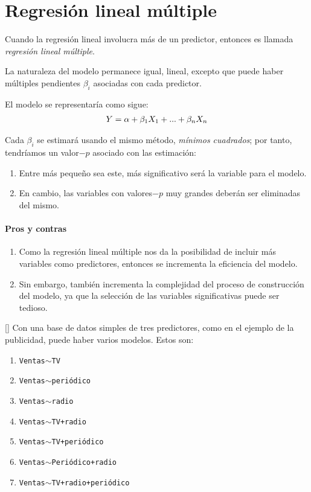 \section{Regresión lineal múltiple}

Cuando la regresión lineal involucra más de un predictor, entonces es llamada \emph{regresión lineal múltiple}.



La naturaleza del modelo permanece igual, lineal, excepto que puede haber múltiples pendientes $\beta_{i}$ asociadas con cada predictor.




El modelo se representaría como sigue:
\begin{align}
	Y = \alpha + \beta_{1}X_{1}+...+\beta_{n}X_{n}
\end{align}



Cada $\beta_{i}$ se estimará usando el mismo método, \emph{mínimos cuadrados}; por tanto, tendríamos un valor$-p$ asociado con las estimación: 
\begin{enumerate}
	\item Entre más pequeño sea este, más significativo será la variable para el modelo. 
	\item En cambio, las variables con valores$-p$ muy grandes deberán ser eliminadas del mismo.
\end{enumerate}


\paragraph{Pros y contras}
\begin{enumerate}
	\item Como la regresión lineal múltiple nos da la posibilidad de incluir más variables como predictores, entonces se incrementa la eficiencia del modelo. 
	
	\item Sin embargo, también incrementa la complejidad del proceso de construcción del modelo, ya que la selección de las variables significativas puede ser tedioso.
\end{enumerate}


[]{}
Con una base de datos simples de tres predictores, como en el ejemplo de la publicidad, puede haber varios modelos. Estos son:
\begin{enumerate}[Modelo 1:]
	\item \texttt{Ventas$\sim$TV}
	\item \texttt{Ventas$\sim$periódico}
	\item \texttt{Ventas$\sim$radio}
	\item \texttt{Ventas$\sim$TV+radio}
	\item \texttt{Ventas$\sim$TV+periódico}
	\item \texttt{Ventas$\sim$Periódico+radio}
	\item \texttt{Ventas$\sim$TV+radio+periódico}
\end{enumerate}



